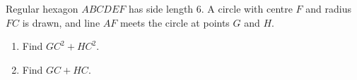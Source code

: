 Regular hexagon $ABCDEF$ has side length $6$. A circle with centre $F$ and radius $FC$ is drawn, and line $AF$ meets the circle at points $G$ and $H$.
\begin{enumerate}
\item[(a)] Find $GC^2+HC^2$.
\item[(b)] Find $GC+HC$.
\end{enumerate}
